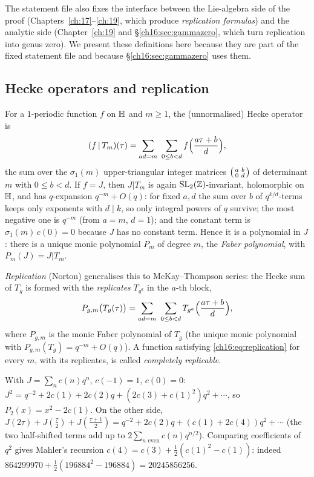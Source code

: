 The statement file also fixes the interface between the Lie-algebra side of the proof (Chapters~\ref{ch:17}--\ref{ch:19},
which produce \emph{replication formulas}) and the analytic side (Chapter~\ref{ch:19} and \S\ref{ch16:sec:gammazero},
which turn replication into genus zero).  We present these definitions here because they are part of the fixed
statement file and because \S\ref{ch16:sec:gammazero} uses them.

\subsection{Hecke operators and replication}

For a $1$-periodic function $f$ on $\mathbb{H}$ and $m\ge1$, the (unnormalised) Hecke operator is
\begin{equation}\label{ch16:eq:hecke}
  (f\,|\,T_m)(\tau)=\sum_{ad=m}\ \sum_{0\le b<d} f\Bigl(\frac{a\tau+b}{d}\Bigr),
\end{equation}
the sum over the $\sigma_1(m)$ upper-triangular integer matrices $\left(\begin{smallmatrix}a&b\\0&d\end{smallmatrix}\right)$ of determinant $m$ with
$0\le b<d$.  If $f=J$, then $J|T_m$ is again $\mathrm{SL}_2(\mathbb{Z})$-invariant, holomorphic on $\mathbb{H}$, and has
$q$-expansion $q^{-m}+O(q)$: for fixed $a,d$ the sum over $b$ of $q^{k/d}$-terms keeps only exponents with $d\mid k$,
so only integral powers of $q$ survive; the most negative one is $q^{-m}$ (from $a=m$, $d=1$); and the constant term is
$\sigma_1(m)\,c(0)=0$ because $J$ has no constant term.  Hence it is a
polynomial in $J$: there is a unique monic polynomial $P_m$ of degree $m$, the \emph{Faber polynomial}, with
$P_m(J)=J|T_m$.

\emph{Replication} (Norton) generalises this to McKay--Thompson series: the Hecke sum of $T_g$ is formed with the
\emph{replicates} $T_{g^a}$ in the $a$-th block,
\begin{equation}\label{ch16:eq:replication}
  P_{g,m}\bigl(T_g(\tau)\bigr)=\sum_{ad=m}\ \sum_{0\le b<d}T_{g^a}\Bigl(\frac{a\tau+b}{d}\Bigr),
\end{equation}
where $P_{g,m}$ is the monic Faber polynomial of $T_g$ (the unique monic polynomial with $P_{g,m}(T_g)=q^{-m}+O(q)$).
A function satisfying \eqref{ch16:eq:replication} for every $m$, with its replicates, is called \emph{completely
replicable}.

\begin{example}[Replication for $J$ at $m=2$]\label{ch16:ex:rep2}
With $J=\sum_n c(n)q^n$, $c(-1)=1$, $c(0)=0$: $J^2=q^{-2}+2c(1)+2c(2)q+(2c(3)+c(1)^2)q^2+\cdots$, so
$P_2(x)=x^2-2c(1)$.  On the other side, $J(2\tau)+J(\tfrac\tau2)+J(\tfrac{\tau+1}2)=q^{-2}+2c(2)q+(c(1)+2c(4))q^2+\cdots$
(the two half-shifted terms add up to $2\sum_{n\text{ even}}c(n)q^{n/2}$).  Comparing coefficients of $q^2$ gives
Mahler's recursion $c(4)=c(3)+\tfrac12(c(1)^2-c(1))$: indeed
$864299970+\tfrac12(196884^2-196884)=20245856256$.
\end{example}


